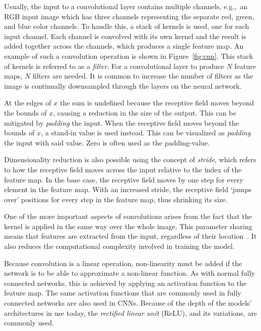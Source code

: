 Usually, the input to a convolutional layer contains multiple channels, e.g.,\ an RGB input image which has three channels representing the separate red, green, and blue color channels.
To handle this, a stack of kernels is used, one for each input channel.
Each channel is convolved with its own kernel and the result is added together across the channels, which produces a single feature map.
An example of such a convolution operation is shown in Figure~\ref{fig:cnn}.
This stack of kernels is referred to as a \textit{filter}.
For a convolutional layer to produce \(N\) feature maps, \(N\) filters are needed.
It is common to increase the number of filters as the image is continually downsampled through the layers on the neural network.

At the edges of \(x\) the sum is undefined because the receptive field moves beyond the bounds of \(x\), causing a reduction in the size of the output.
This can be mitigated by \textit{padding} the input.
When the receptive field moves beyond the bounds of \(x\), a stand-in value is used instead.
This can be visualized as \textit{padding} the input with said value.
Zero is often used as the padding-value.

Dimensionality reduction is also possible using the concept of \textit{stride}, which refers to how the receptive field moves across the input relative to the index of the feature map.
In the base case, the receptive field moves by one step for every element in the feature map.
With an increased stride, the receptive field `jumps over' positions for every step in the feature map, thus shrinking its size.

One of the more important aspects of convolutions arises from the fact that the kernel is applied in the same way over the whole image.
This parameter sharing means that features are extracted from the input, regardless of their location\ \parencite{lecum1989}.
It also reduces the computational complexity involved in training the model.

Because convolution is a linear operation, non-linearity must be added if the network is to be able to approximate a non-linear function.
As with normal fully connected networks, this is achieved by applying an activation function to the feature map.
The same activation functions that are commonly used in fully connected networks are also used in CNNs.
Because of the depth of the models’ architectures in use today, the \textit{rectified linear unit} (ReLU), and its variations, are commonly used.

